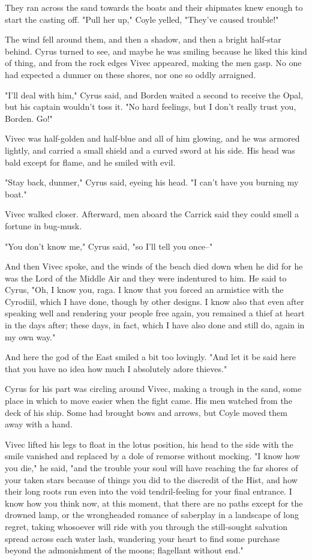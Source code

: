 They ran across the sand towards the boats and their shipmates knew enough to start the casting off. "Pull her up," Coyle yelled, "They’ve caused trouble!"

The wind fell around them, and then a shadow, and then a bright half-star behind. Cyrus turned to see, and maybe he was smiling because he liked this kind of thing, and from the rock edges Vivec appeared, making the men gasp. No one had expected a dunmer on these shores, nor one so oddly arraigned.

"I’ll deal with him," Cyrus said, and Borden waited a second to receive the Opal, but his captain wouldn’t toss it. "No hard feelings, but I don’t really trust you, Borden. Go!"

Vivec was half-golden and half-blue and all of him glowing, and he was armored lightly, and carried a small shield and a curved sword at his side. His head was bald except for flame, and he smiled with evil.

"Stay back, dunmer," Cyrus said, eyeing his head. "I can’t have you burning my boat."

Vivec walked closer. Afterward, men aboard the Carrick said they could smell a fortune in bug-musk.

"You don’t know me," Cyrus said, "so I’ll tell you once--"

And then Vivec spoke, and the winds of the beach died down when he did for he was the Lord of the Middle Air and they were indentured to him. He said to Cyrus, "Oh, I know you, raga. I know that you forced an armistice with the Cyrodiil, which I have done, though by other designs. I know also that even after speaking well and rendering your people free again, you remained a thief at heart in the days after; these days, in fact, which I have also done and still do, again in my own way."

And here the god of the East smiled a bit too lovingly. "And let it be said here that you have no idea how much I absolutely adore thieves."

Cyrus for his part was circling around Vivec, making a trough in the sand, some place in which to move easier when the fight came. His men watched from the deck of his ship. Some had brought bows and arrows, but Coyle moved them away with a hand.

Vivec lifted his legs to float in the lotus position, his head to the side with the smile vanished and replaced by a dole of remorse without mocking. "I know how you die," he said, "and the trouble your soul will have reaching the far shores of your taken stars because of things you did to the discredit of the Hist, and how their long roots run even into the void tendril-feeling for your final entrance. I know how you think now, at this moment, that there are no paths except for the drowned lamp, or the wrongheaded romance of saberplay in a landscape of long regret, taking whosoever will ride with you through the still-sought salvation spread across each water lash, wandering your heart to find some purchase beyond the admonishment of the moons; flagellant without end."

